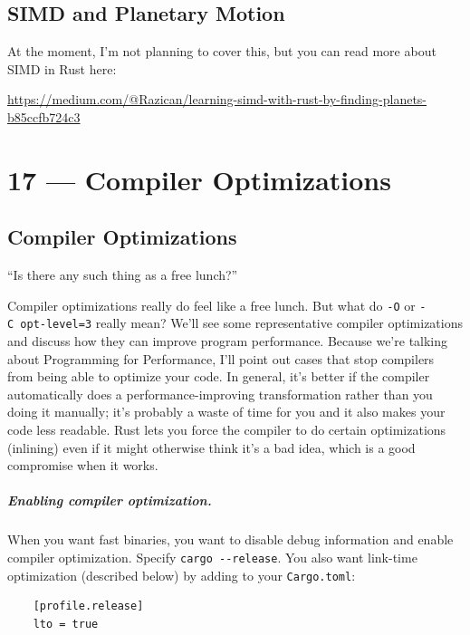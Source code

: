 \documentclass[a4paper]{report}
\begin{document}
\section*{SIMD and Planetary Motion}

At the moment, I'm not planning to cover this, but you can read more about SIMD
in Rust here:
\begin{center}
\url{https://medium.com/@Razican/learning-simd-with-rust-by-finding-planets-b85ccfb724c3}
\end{center}









\chapter*{17 --- Compiler Optimizations}


\section*{Compiler Optimizations}

\hfill ``Is there any such thing as a free lunch?''

Compiler optimizations really do feel like a free lunch.
But what do {\tt -O} or
{\tt -C~opt-level=3} really mean?
We'll see some representative compiler optimizations and discuss how
they can improve program performance. Because we're talking about
Programming for Performance, I'll point out cases that stop compilers
from being able to optimize your code. In general, it's better if the
compiler automatically does a performance-improving transformation
rather than you doing it manually; it's probably a waste of time for
you and it also makes your code less readable. Rust lets you force the compiler to do certain optimizations (inlining) even if it might otherwise think it's a bad idea, which is a good compromise when it works.

\paragraph{Enabling compiler optimization.} When you want fast binaries, you want to disable debug information and enable compiler optimization. Specify \texttt{cargo~-{}-release}. You also want link-time optimization (described below) by adding to your \texttt{Cargo.toml}:
\begin{verbatim}
    [profile.release]
    lto = true
\end{verbatim}
\end{document}
